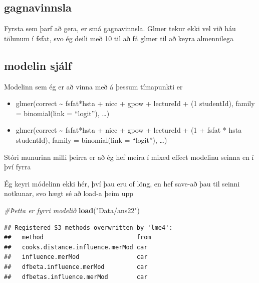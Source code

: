 \documentclass[
]{article}
\newenvironment{Shaded}{\begin{snugshade}}{\end{snugshade}}
\newcommand{\CommentTok}[1]{\textcolor[rgb]{0.56,0.35,0.01}{\textit{#1}}}
\newcommand{\DecValTok}[1]{\textcolor[rgb]{0.00,0.00,0.81}{#1}}
\newcommand{\KeywordTok}[1]{\textcolor[rgb]{0.13,0.29,0.53}{\textbf{#1}}}
\newcommand{\NormalTok}[1]{#1}
\newcommand{\OperatorTok}[1]{\textcolor[rgb]{0.81,0.36,0.00}{\textbf{#1}}}
\newcommand{\StringTok}[1]{\textcolor[rgb]{0.31,0.60,0.02}{#1}}
\begin{document}
\hypertarget{gagnavinnsla}{%
\subsection{gagnavinnsla}\label{gagnavinnsla}}

Fyrsta sem þarf að gera, er smá gagnavinnsla. Glmer tekur ekki vel við háu tölunum í fsfat, svo ég deili með 10 til að fá glmer til að keyra almennilega

\begin{Shaded}
\end{Shaded}

\hypertarget{modelin-sjuxe1lf}{%
\subsection{modelin sjálf}\label{modelin-sjuxe1lf}}

Modelinn sem ég er að vinna með á þessum tímapunkti er

\begin{itemize}
\item
  glmer(correct \textasciitilde{} fsfat*hsta + nicc + gpow + lectureId + (1 \textbar{} studentId), family = binomial(link = ``logit''), \ldots)
\item
  glmer(correct \textasciitilde{} fsfat*hsta + nicc + gpow + lectureId + (1 + fsfat * hsta \textbar{} studentId), family = binomial(link = ``logit''), \ldots)
\end{itemize}

Stóri munurinn milli þeirra er að ég hef meira í mixed effect modelinu seinna en í því fyrra

Ég keyri módelinn ekki hér, því þau eru of löng, en hef save-að þau til seinni notkunar, svo hægt sé að load-a þeim upp

\begin{Shaded}
\begin{Highlighting}[]
\CommentTok{#Þetta er fyrri modelið}
\KeywordTok{load}\NormalTok{(}\StringTok{"Data/ans22"}\NormalTok{)}
\end{Highlighting}
\end{Shaded}

\begin{verbatim}
## Registered S3 methods overwritten by 'lme4':
##   method                          from
##   cooks.distance.influence.merMod car 
##   influence.merMod                car 
##   dfbeta.influence.merMod         car 
##   dfbetas.influence.merMod        car
\end{verbatim}
\end{document}
